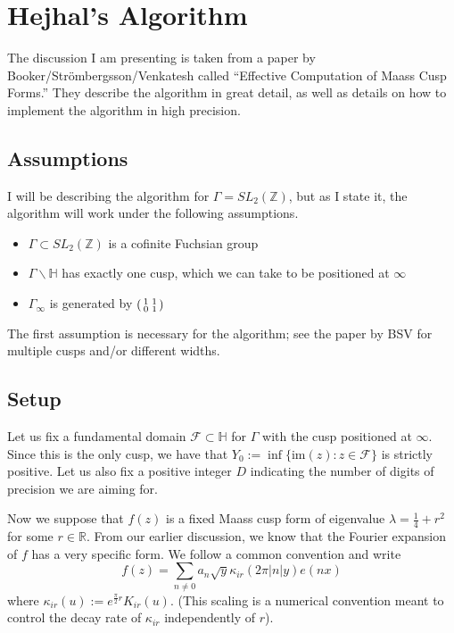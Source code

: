 \documentclass[]{article}
\begin{document}
\section*{Hejhal's Algorithm}

The discussion I am presenting is taken from a paper by Booker/Str\"ombergsson/Venkatesh called ``Effective Computation of Maass Cusp Forms.''
They describe the algorithm in great detail, as well as details on how to implement the algorithm in high precision.

\subsection*{Assumptions}

I will be describing the algorithm for $\Gamma = SL_2(\mathbb{Z})$, but as I state it, the algorithm will work under the following assumptions.
\begin{itemize}
	\item $\Gamma \subset SL_2(\mathbb{Z})$ is a cofinite Fuchsian group
	\item $\Gamma\backslash\mathbb{H}$ has exactly one cusp, which we can take to be positioned at $\infty$
	\item $\Gamma_\infty$ is generated by
	$\begin{psmallmatrix}
		1 & 1 \\
		0 & 1
	\end{psmallmatrix}$
\end{itemize}
The first assumption is necessary for the algorithm; see the paper by BSV for multiple cusps and/or different widths.

\subsection*{Setup}

Let us fix a fundamental domain $\mathcal{F} \subset \mathbb{H}$ for $\Gamma$ with the cusp positioned at $\infty$.
Since this is the only cusp, we have that $Y_0 := \inf\{ \text{im}(z) : z \in \mathcal{F} \}$ is strictly positive.
Let us also fix a positive integer $D$ indicating the number of digits of precision we are aiming for.

Now we suppose that $f(z)$ is a fixed Maass cusp form of eigenvalue $\lambda = \frac{1}{4} + r^2$ for some $r \in \mathbb{R}$.
From our earlier discussion, we know that the Fourier expansion of $f$ has a very specific form.
We follow a common convention and write
$$
f(z) = \sum_{n\neq 0}a_n\sqrt{y}\kappa_{ir}(2\pi|n|y)e(nx)
$$
where $\kappa_{ir}(u) := e^{\frac{\pi}{2}r}K_{ir}(u)$.
(This scaling is a numerical convention meant to control the decay rate of $\kappa_{ir}$ independently of $r$).
\end{document}
